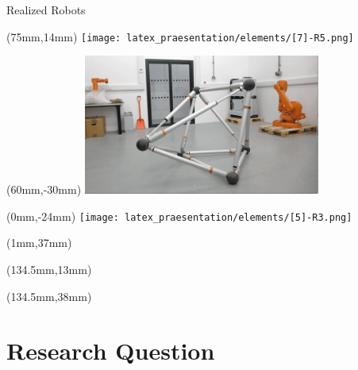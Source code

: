 \documentclass[11pt,aspectratio=169]{beamer}
\begin{document}
\begin{frame}[fragile]{Realized Robots}

        \begin{textblock*}{8cm}(75mm,14mm) %
        \texttt{[image: latex\_praesentation/elements/[7]-R5.png]}
        \end{textblock*} 
        
        \begin{textblock*}{8cm}(60mm,-30mm) %
        {\color{white}\href{https://youtu.be/x40DKmI6l84}{\includegraphics[height=46mm]{elements/[6]-R4.png}}}
        \end{textblock*}
    
        \begin{textblock*}{5cm}(0mm,-24mm) %
        \texttt{[image: latex\_praesentation/elements/[5]-R3.png]}
        \end{textblock*}

        \begin{textblock*}{5cm}(1mm,37mm) %
        {\color{white} \tiny \cite{SHAPE}}
        \end{textblock*}

        \begin{textblock*}{5cm}(134.5mm,13mm) %
        {\color{white} \tiny \cite{william-bondin}}
        \end{textblock*}

        \begin{textblock*}{5cm}(134.5mm,38mm) %
        {\color{black} \tiny \cite{10.1145/3448326.3448332}}
        \end{textblock*}
 
\end{frame}


\section{Research Question}
\end{document}
